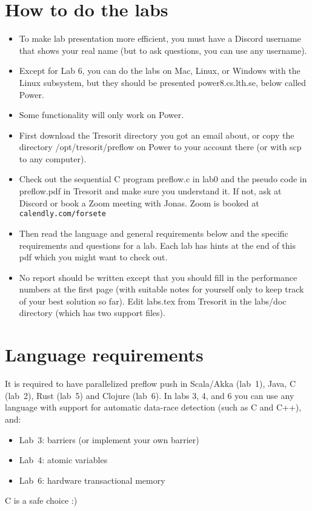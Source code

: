\documentclass{forsete}
\begin{document}
\section{How to do the labs}
\begin{itemize}
\item To make lab presentation more efficient, you must have a Discord username that shows your real name (but to ask questions, you can use any username).
\item Except for Lab 6, you can do the labs on Mac, Linux, or Windows with the Linux subsystem, but they
should be presented power8.cs.lth.se, below called Power.
\item Some functionality will only work on Power.
\item First download the Tresorit directory you got an email about, or copy the directory /opt/tresorit/preflow on Power to your account 
there (or with scp to any computer).
\item Check out the sequential C program preflow.c in lab0 and the pseudo code in preflow.pdf in Tresorit and
make sure you understand it. If not, ask at Discord or book a Zoom meeting with Jonas. Zoom is booked 
at \verb!calendly.com/forsete!
\item Then read the language and general requirements below and the specific requirements and questions for a lab. Each
lab has hints at the end of this pdf which you might want to check out.
\item No report should be written except that you should fill in the performance numbers at the first page (with suitable notes for yourself 
only to keep track of your best solution so far). Edit labs.tex from Tresorit in the labs/doc directory (which has two support files).
\end{itemize}
\section{\label{lang.sec}Language requirements}
It is required to have parallelized preflow push in Scala/Akka (lab~1), Java, C (lab~2), Rust (lab~5) 
and Clojure (lab~6). In labs 3, 4, and 6 you can use any language with support for 
automatic data-race detection (such as C and C++), and:
\begin{itemize}
\item Lab~3: barriers (or implement your own barrier)
\item Lab~4: atomic variables 
\item Lab~6: hardware transactional memory
\end{itemize}
C is a safe choice :)
\end{document}
